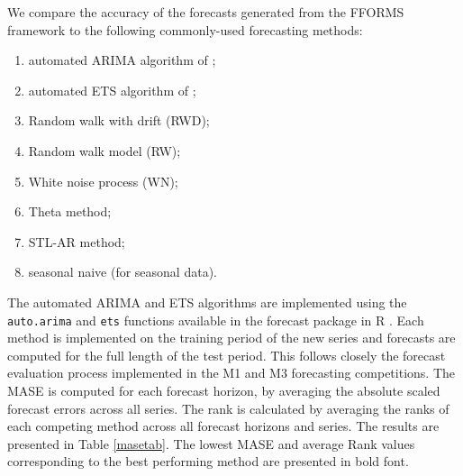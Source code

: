 \documentclass[11pt,a4paper,]{article}
\providecommand{\tightlist}{%
  \setlength{\itemsep}{0pt}\setlength{\parskip}{0pt}}
\theoremstyle{definition}
\theoremstyle{definition}
\theoremstyle{definition}
\theoremstyle{remark}
\begin{document}
We compare the accuracy of the forecasts generated from the FFORMS
framework to the following commonly-used forecasting methods:

\begin{enumerate}
\def\labelenumi{\arabic{enumi}.}
\tightlist
\item
  automated ARIMA algorithm of \textcite{Hyndman2008};
\item
  automated ETS algorithm of \textcite{Hyndman2008};
\item
  Random walk with drift (RWD);
\item
  Random walk model (RW);
\item
  White noise process (WN);
\item
  Theta method;
\item
  STL-AR method;
\item
  seasonal naive (for seasonal data).
\end{enumerate}

The automated ARIMA and ETS algorithms are implemented using the
\texttt{auto.arima} and \texttt{ets} functions available in the forecast
package in R \autocite{forecast}. Each method is implemented on the
training period of the new series and forecasts are computed for the
full length of the test period. This follows closely the forecast
evaluation process implemented in the M1 and M3 forecasting
competitions. The MASE is computed for each forecast horizon, by
averaging the absolute scaled forecast errors across all series. The
rank is calculated by averaging the ranks of each competing method
across all forecast horizons and series. The results are presented in
Table \ref{masetab}. The lowest MASE and average Rank values
corresponding to the best performing method are presented in bold font.
\end{document}
